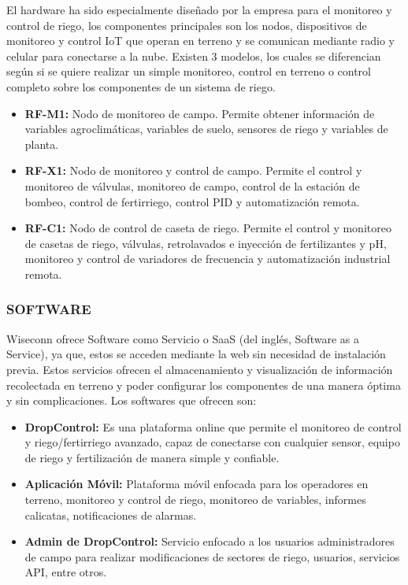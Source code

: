 El hardware ha sido especialmente diseñado por la empresa para el monitoreo y control de riego, los componentes principales son los nodos, dispositivos de monitoreo y control IoT que operan en terreno y se comunican mediante radio y celular para conectarse a la nube. Existen 3 modelos, los cuales se diferencian según si se quiere realizar un simple monitoreo, control en terreno o control completo sobre los componentes de un sistema de riego.
\begin{itemize}
	\item \textbf{RF-M1:} Nodo de monitoreo de campo. Permite obtener información de variables agroclimáticas, variables de suelo, sensores de riego y variables de planta.
	\item \textbf{RF-X1:} Nodo de monitoreo y control de campo. Permite el control y monitoreo de válvulas, monitoreo de campo, control de la estación de bombeo, control de fertirriego, control PID y automatización remota.
	\item \textbf{RF-C1:} Nodo de control de caseta de riego. Permite el control y monitoreo de casetas de riego, válvulas, retrolavados e inyección de fertilizantes y pH, monitoreo y control de variadores de frecuencia y automatización industrial remota.
\end{itemize}

\subsubsection{SOFTWARE}
Wiseconn ofrece Software como Servicio o SaaS (del inglés, Software as a Service), ya que, estos se acceden mediante la web sin necesidad de instalación previa. Estos servicios ofrecen el almacenamiento y visualización de información recolectada en terreno y poder configurar los componentes de una manera óptima y sin complicaciones. Los softwares que ofrecen son:
\begin{itemize}
    \item \textbf{DropControl:} Es una plataforma online que permite el monitoreo de control y riego/fertirriego avanzado, capaz de conectarse con cualquier sensor, equipo de riego y fertilización de manera simple y confiable.
    \item \textbf{Aplicación Móvil:} Plataforma móvil enfocada para los operadores en terreno, monitoreo y control de riego, monitoreo de variables, informes calicatas, notificaciones de alarmas.
    \item \textbf{Admin de DropControl:} Servicio enfocado a los usuarios administradores de campo para realizar modificaciones de sectores de riego, usuarios, servicios API, entre otros.
\end{itemize}

